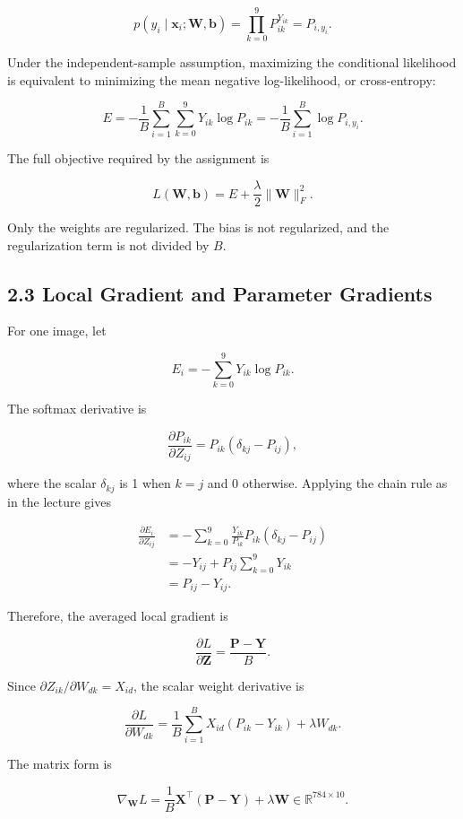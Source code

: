 \documentclass[UTF8,a4paper,12pt,fontset=fandol]{ctexart}
\begin{document}
\[
p(y_i\mid\boldsymbol{x}_i;\boldsymbol{W},\boldsymbol{b})
=\prod_{k=0}^{9}P_{ik}^{Y_{ik}}=P_{i,y_i}.
\]

Under the independent-sample assumption, maximizing the conditional likelihood is equivalent to minimizing the mean negative log-likelihood, or cross-entropy:

\[
E=-\frac{1}{B}\sum_{i=1}^{B}\sum_{k=0}^{9}Y_{ik}\log P_{ik}
=-\frac{1}{B}\sum_{i=1}^{B}\log P_{i,y_i}.
\]

The full objective required by the assignment is

\[
L(\boldsymbol{W},\boldsymbol{b})
=E+\frac{\lambda}{2}\lVert\boldsymbol{W}\rVert_F^2.
\]

Only the weights are regularized. The bias is not regularized, and the regularization term is not divided by \(B\).

\subsection*{2.3 Local Gradient and Parameter Gradients}

For one image, let

\[
E_i=-\sum_{k=0}^{9}Y_{ik}\log P_{ik}.
\]

The softmax derivative is

\[
\frac{\partial P_{ik}}{\partial Z_{ij}}
=P_{ik}(\delta_{kj}-P_{ij}),
\]

where the scalar \(\delta_{kj}\) is 1 when \(k = j\) and 0 otherwise. Applying the chain rule as in the lecture gives

\[
\begin{aligned}
\frac{\partial E_i}{\partial Z_{ij}}
&=-\sum_{k=0}^{9}\frac{Y_{ik}}{P_{ik}}
P_{ik}(\delta_{kj}-P_{ij})\\
&=-Y_{ij}+P_{ij}\sum_{k=0}^{9}Y_{ik}\\
&=P_{ij}-Y_{ij}.
\end{aligned}
\]

Therefore, the averaged local gradient is

\[
\frac{\partial L}{\partial\boldsymbol{Z}}
=\frac{\boldsymbol{P}-\boldsymbol{Y}}{B}.
\]

Since \(\partial Z_{ik}/\partial W_{dk}=X_{id}\), the scalar weight derivative is

\[
\frac{\partial L}{\partial W_{dk}}
=\frac{1}{B}\sum_{i=1}^{B}X_{id}(P_{ik}-Y_{ik})+\lambda W_{dk}.
\]

The matrix form is

\[
\boxed{
\nabla_{\boldsymbol{W}}L
=\frac{1}{B}\boldsymbol{X}^{\top}(\boldsymbol{P}-\boldsymbol{Y})
+\lambda\boldsymbol{W}}
\in\mathbb{R}^{784\times10}.
\]
\end{document}
